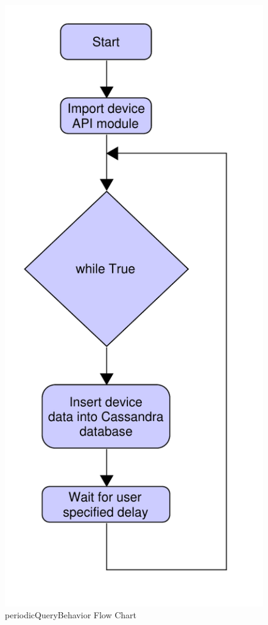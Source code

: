 \documentclass[conference]{IEEEtran}
\begin{document}
\begin{figure}[htbp]
    \centering
    \includegraphics[scale=0.3]{figs/agents/periodicQueryBehavior.pdf}
    \caption{periodicQueryBehavior Flow Chart}
    \label{fig:periodicQueryBehavior}
\end{figure}
\end{document}

